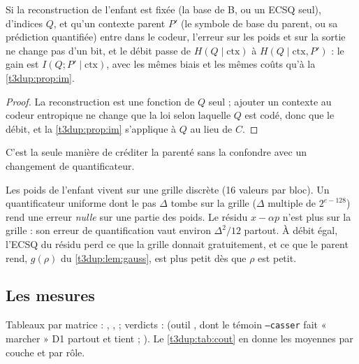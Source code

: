 \begin{proposition}\label{t3dup:prop:identique}
Si la reconstruction de l'enfant est fixée (la base de B, ou un ECSQ seul), d'indices $Q$, et qu'un contexte parent $P'$ (le symbole de base du parent, ou sa prédiction quantifiée) entre dans le codeur, l'erreur sur les poids et sur la sortie ne change pas d'un bit, et le débit passe de $H(Q\mid\mathrm{ctx})$ à $H(Q\mid\mathrm{ctx}, P')$ : le gain est $I(Q;P'\mid\mathrm{ctx})$, avec les mêmes biais et les mêmes coûts qu'à la \cref{t3dup:prop:im}.
\end{proposition}

\begin{proof}
La reconstruction est une fonction de $Q$ seul ; ajouter un contexte au codeur entropique ne change que la loi selon laquelle $Q$ est codé, donc que le débit, et la \cref{t3dup:prop:im} s'applique à $Q$ au lieu de $C$.
\end{proof}

C'est la seule manière de créditer la parenté sans la confondre avec un changement de quantificateur.

\begin{remarque}\label{t3dup:rem:grille}
Les poids de l'enfant vivent sur une grille discrète (16 valeurs par bloc). Un quantificateur uniforme dont le pas $\Delta$ tombe sur la grille ($\Delta$ multiple de $2^{e-128}$) rend une erreur \emph{nulle} sur une partie des poids. Le résidu $x - \alpha p$ n'est plus sur la grille : son erreur de quantification vaut environ $\Delta^2/12$ partout. À débit égal, l'ECSQ du résidu perd ce que la grille donnait gratuitement, et ce que le parent rend, $g(\rho)$ du \cref{t3dup:lem:gauss}, est plus petit dès que $\rho$ est petit.
\end{remarque}

\subsection{Les mesures}

Tableaux par matrice : , ,  ; verdicts :  (outil , dont le témoin \texttt{--casser} fait « marcher » D1 partout et tient ; ). Le \cref{t3dup:tab:cout} en donne les moyennes par couche et par rôle.

